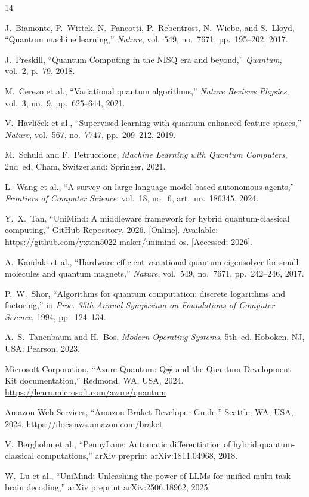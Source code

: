 ﻿\documentclass[12pt,a4paper]{article}
\begin{document}
\newpage
\begin{thebibliography}{14}

J.~Biamonte, P.~Wittek, N.~Pancotti, P.~Rebentrost, N.~Wiebe, and S.~Lloyd,
``Quantum machine learning,''
\textit{Nature}, vol.~549, no.~7671, pp.~195--202, 2017.

J.~Preskill,
``Quantum Computing in the NISQ era and beyond,''
\textit{Quantum}, vol.~2, p.~79, 2018.

M.~Cerezo et al.,
``Variational quantum algorithms,''
\textit{Nature Reviews Physics}, vol.~3, no.~9, pp.~625--644, 2021.

V.~Havl\'{i}\v{c}ek et al.,
``Supervised learning with quantum-enhanced feature spaces,''
\textit{Nature}, vol.~567, no.~7747, pp.~209--212, 2019.

M.~Schuld and F.~Petruccione,
\textit{Machine Learning with Quantum Computers}, 2nd~ed.
Cham, Switzerland: Springer, 2021.

L.~Wang et al.,
``A survey on large language model-based autonomous agents,''
\textit{Frontiers of Computer Science}, vol.~18, no.~6, art.~no.~186345, 2024.

Y.~X.~Tan,
``UniMind: A middleware framework for hybrid quantum-classical computing,''
GitHub Repository, 2026.
[Online]. Available: \url{https://github.com/yxtan5022-maker/unimind-os}.
[Accessed: 2026].

A.~Kandala et al.,
``Hardware-efficient variational quantum eigensolver for small molecules and quantum magnets,''
\textit{Nature}, vol.~549, no.~7671, pp.~242--246, 2017.

P.~W.~Shor,
``Algorithms for quantum computation: discrete logarithms and factoring,''
in \textit{Proc. 35th Annual Symposium on Foundations of Computer Science},
1994, pp.~124--134.

A.~S.~Tanenbaum and H.~Bos,
\textit{Modern Operating Systems}, 5th~ed.
Hoboken, NJ, USA: Pearson, 2023.

Microsoft Corporation,
``Azure Quantum: Q\# and the Quantum Development Kit documentation,''
Redmond, WA, USA, 2024.
\url{https://learn.microsoft.com/azure/quantum}

Amazon Web Services,
``Amazon Braket Developer Guide,''
Seattle, WA, USA, 2024.
\url{https://docs.aws.amazon.com/braket}

V.~Bergholm et al.,
``PennyLane: Automatic differentiation of hybrid quantum-classical computations,''
arXiv preprint arXiv:1811.04968, 2018.

W.~Lu et al.,
``UniMind: Unleashing the power of LLMs for unified multi-task brain decoding,''
arXiv preprint arXiv:2506.18962, 2025.

\end{thebibliography}
\end{document}
